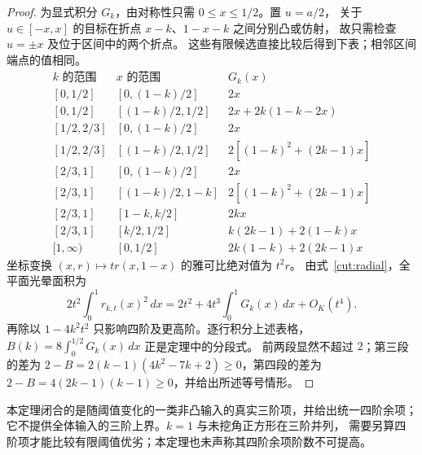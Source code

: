 \begin{proof}
为显式积分 $G_k$，由对称性只需 $0\le x\le1/2$。置 $u=a/2$，
关于 $u\in[-x,x]$ 的目标在折点 $x-k$、$1-x-k$ 之间分别凸或仿射，
故只需检查 $u=\pm x$ 及位于区间中的两个折点。
这些有限候选直接比较后得到下表；相邻区间端点的值相同。
\[
\begin{array}{c|c|c}
 k\text{ 的范围}&x\text{ 的范围}&G_k(x)\\\hline
 {}[0,1/2]&[0,(1-k)/2]&2x\\
 {}[0,1/2]&[(1-k)/2,1/2]&2x+2k(1-k-2x)\\\hline
 {}[1/2,2/3]&[0,(1-k)/2]&2x\\
 {}[1/2,2/3]&[(1-k)/2,1/2]&2[(1-k)^2+(2k-1)x]\\\hline
 {}[2/3,1]&[0,(1-k)/2]&2x\\
 {}[2/3,1]&[(1-k)/2,1-k]&2[(1-k)^2+(2k-1)x]\\
 {}[2/3,1]&[1-k,k/2]&2kx\\
 {}[2/3,1]&[k/2,1/2]&k(2k-1)+2(1-k)x\\\hline
 {}[1,\infty)&[0,1/2]&2k(1-k)+2(2k-1)x
\end{array}
\]
坐标变换 $(x,r)\mapsto tr(x,1-x)$ 的雅可比绝对值为 $t^2r$。
由式~\eqref{cut:radial}，全平面光晕面积为
\[
 2t^2\int_0^1r_{k,t}(x)^2\,dx
 =2t^2+4t^3\int_0^1G_k(x)\,dx+O_K(t^4).
\]
再除以 $1-4k^2t^2$ 只影响四阶及更高阶。逐行积分上述表格，
$B(k)=8\int_0^{1/2}G_k(x)\,dx$ 正是定理中的分段式。
前两段显然不超过 $2$；第三段的差为
$2-B=2(k-1)(4k^2-7k+2)\ge0$，第四段的差为
$2-B=4(2k-1)(k-1)\ge0$，并给出所述等号情形。
\end{proof}

\begin{remark}\label{cut:scope}
本定理闭合的是随阈值变化的一类非凸输入的真实三阶项，并给出统一四阶余项；
它不提供全体输入的三阶上界。$k=1$ 与未挖角正方形在三阶并列，
需要另算四阶项才能比较有限阈值优劣；本定理也未声称其四阶余项阶数不可提高。
\end{remark}
